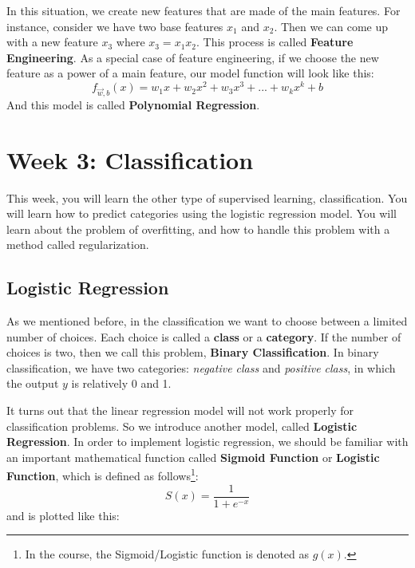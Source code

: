 \documentclass[a4paper, 12pt]{book}
\begin{document}
In this situation, we create new features that are made of the main features. For instance, consider we have two base features $x_1$ and $x_2$. Then we can come up with a new feature $x_3$ where $x_3 = x_1x_2$. This process is called \textbf{Feature Engineering}. As a special case of feature engineering, if we choose the new feature as a power of a main feature, our model function will look like this: \[f_{\Vec{w},b}(x) = w_1x + w_2x^2 + w_3x^3 + ... + w_kx^k + b\] And this model is called \textbf{Polynomial Regression}.

\section{Week 3: Classification}
This week, you will learn the other type of supervised learning, classification. You will learn how to predict categories using the logistic regression model. You will learn about the problem of overfitting, and how to handle this problem with a method called regularization.

\subsection{Logistic Regression}
As we mentioned before, in the classification we want to choose between a limited number of choices. Each choice is called a \textbf{class} or a \textbf{category}. If the number of choices is two, then we call this problem, \textbf{Binary Classification}. In binary classification, we have two categories: \emph{negative class} and \emph{positive class}, in which the output $y$ is relatively 0 and 1.

It turns out that the linear regression model will not work properly for classification problems. So we introduce another model, called \textbf{Logistic Regression}. In order to implement logistic regression, we should be familiar with an important mathematical function called \textbf{Sigmoid Function} or \textbf{Logistic Function}, which is defined as follows\footnote{In the course, the Sigmoid/Logistic function is denoted as $g(x)$.}: \[S(x) = \frac{1}{1+e^{-x}}\] and is plotted like this:
\begin{center}
\end{center}
\end{document}
